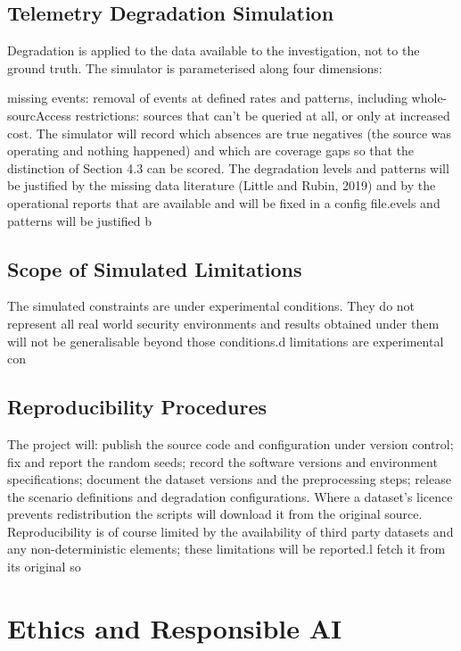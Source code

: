 \documentclass[a4paper,11pt]{article}
\begin{document}
\subsection{Telemetry Degradation Simulation}
Degradation is applied to the data available to the investigation, not to the ground truth. The simulator is parameterised along four dimensions:\par
missing events: removal of events at defined rates and patterns, including whole-sourcAccess restrictions: sources that can't be queried at all, or only at increased cost. The simulator will record which absences are true negatives (the source was operating and nothing happened) and which are coverage gaps so that the distinction of Section 4.3 can be scored. The degradation levels and patterns will be justified by the missing data literature (Little and Rubin, 2019) and by the operational reports that are available and will be fixed in a config file.evels and patterns will be justified b\subsection{Scope of Simulated Limitations}
The simulated constraints are under experimental conditions. They do not represent all real world security environments and results obtained under them will not be generalisable beyond those conditions.d limitations are experimental con\subsection{Reproducibility Procedures}
The project will: publish the source code and configuration under version control; fix and report the random seeds; record the software versions and environment specifications; document the dataset versions and the preprocessing steps; release the scenario definitions and degradation configurations. Where a dataset's licence prevents redistribution the scripts will download it from the original source. Reproducibility is of course limited by the availability of third party datasets and any non-deterministic elements; these limitations will be reported.l fetch it from its original so\section{Ethics and Responsible AI}
\end{document}
